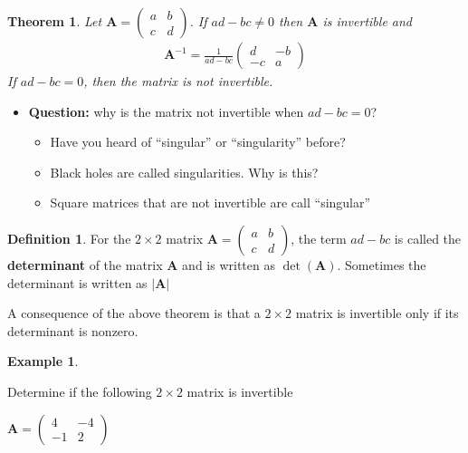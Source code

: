 \documentclass[
]{book}
\providecommand{\tightlist}{%
  \setlength{\itemsep}{0pt}\setlength{\parskip}{0pt}}
\newtheorem{theorem}{Theorem}[chapter]
\theoremstyle{definition}
\newtheorem{definition}{Definition}[chapter]
\theoremstyle{definition}
\newtheorem{example}{Example}[chapter]
\theoremstyle{definition}
\theoremstyle{remark}
\begin{document}
\begin{theorem}
\protect\hypertarget{thm:unnamed-chunk-132}{}{\label{thm:unnamed-chunk-132} }Let \(\mathbf{A} = \begin{pmatrix} a & b \\ c & d \end{pmatrix}\). If \(ad - bc \neq 0\) then \(\mathbf{A}\) is invertible and
\[
\begin{aligned}
\mathbf{A}^{-1} = \frac{1}{ad - bc} \begin{pmatrix} d & -b \\ -c & a \end{pmatrix}
\end{aligned}
\]
If \(ad - bc = 0\), then the matrix is not invertible.
\end{theorem}

\begin{itemize}
\tightlist
\item
  \textbf{Question:} why is the matrix not invertible when \(ad - bc = 0\)?

  \begin{itemize}
  \tightlist
  \item
    Have you heard of ``singular'' or ``singularity'' before?
  \item
    Black holes are called singularities. Why is this?
  \item
    Square matrices that are not invertible are call ``singular''
  \end{itemize}
\end{itemize}

\begin{definition}
\protect\hypertarget{def:unnamed-chunk-133}{}{\label{def:unnamed-chunk-133} }For the \(2 \times 2\) matrix \(\mathbf{A} = \begin{pmatrix} a & b \\ c & d \end{pmatrix}\), the term \(ad - bc\) is called the \textbf{determinant} of the matrix \(\mathbf{A}\) and is written as \(\operatorname{det}(\mathbf{A})\). Sometimes the determinant is written as \(| \mathbf{A}|\)
\end{definition}

A consequence of the above theorem is that a \(2 \times 2\) matrix is invertible only if its determinant is nonzero.

\begin{example}
\protect\hypertarget{exm:unlabeled-div-76}{}\label{exm:unlabeled-div-76}

Determine if the following \(2 \times 2\) matrix is invertible

\(\mathbf{A} = \begin{pmatrix} 4 & -4 \\ -1 & 2 \end{pmatrix}\)

\end{example}
\end{document}

